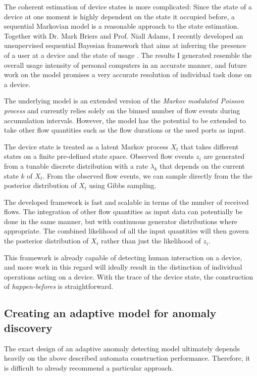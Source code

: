 \documentclass[a4paper,12pt,twoside]{report}
\begin{document}
The coherent estimation of device states is more complicated: Since the state of a device at one moment is highly dependent on the state it occupied before, a sequential Markovian model is a reasonable approach to the state estimation. Together with Dr. Mark Briers and Prof. Niall Adams, I recently developed an unsupervised sequential Bayesian framework that aims at inferring the presence of a user at a device and the state of usage \cite{Henrythesis2017}. The results I generated resemble the overall usage intensity of personal computers in an accurate manner, and future work on the model promises a very accurate resolution of individual task done on a device. 



The underlying model is an extended version of the \textit{Markov modulated Poisson process} and currently relies solely on the binned number of flow events during accumulation intervals. However, the model has the potential to be extended to take other flow quantities such as the flow durations or the used ports as input. 

The device state is treated as a latent Markov process $X_t$ that takes different states on a finite pre-defined state space. Observed flow events $z_i$ are generated from a tunable discrete distribution with a rate $\lambda_k$ that depends on the current state $k$ of $X_t$. From the observed flow events, we can sample directly from the the posterior distribution of $X_t$ using Gibbs sampling. 

The developed framework is fast and scalable in terms of the number of received flows. The integration of other flow quantities as input data can potentially be done in the same manner, but with continuous generator distributions where appropriate. The combined likelihood of all the input quantities will then govern the posterior distribution of $X_t$ rather than just the likelihood of $z_i$.

This framework is already capable of detecting human interaction on a device, and more work in this regard will ideally result in the distinction of individual operations acting on a device. With the trace of the device state, the construction of \textit{happen-befores} is straightforward.  

\subsection{Creating an adaptive model for anomaly discovery}

The exact design of an adaptive anomaly detecting model ultimately depends heavily on the above described automata construction performance. Therefore, it is difficult to already recommend a particular approach. 
\end{document}
